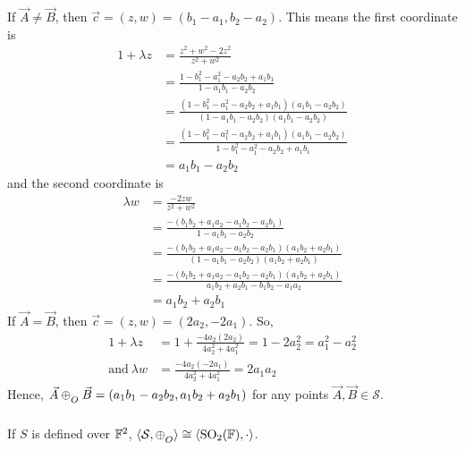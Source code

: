 \noindent
If $\vec{A}\neq\vec{B}$, then $\vec{c}=(z,w)=(b_1-a_1,b_2-a_2)$. This means the
first coordinate is
\begin{align*}
    1 + \lambda z &= \frac{z^2 + w^2 - 2z^2}{z^2 + w^2} \\
                  &= \frac{1 - b_1^2 - a_1^2 - a_2 b_2 + a_1 b_1}{1 - a_1 b_1 - a_2 b_2} \\
                  &= \frac{(1 - b_1^2 - a_1^2 - a_2 b_2 + a_1 b_1)(a_1 b_1 - a_2 b_2)}{(1 - a_1 b_1 - a_2 b_2)(a_1 b_1 - a_2 b_2)} \\
                  &= \frac{(1 - b_1^2 - a_1^2 - a_2 b_2 + a_1 b_1)(a_1 b_1 - a_2 b_2)}{1 - b_1^2 - a_1^2 - a_2 b_2 + a_1 b_1} \\
                  &= a_1 b_1 - a_2 b_2
\end{align*}
and the second coordinate is
\begin{align*}
    \lambda w     &= \frac{-2zw}{z^2 + w^2} \\
                  &= \frac{-(b_1 b_2 + a_1 a_2 - a_1 b_2 - a_2 b_1)}{1 - a_1 b_1 - a_2 b_2} \\
                  &= \frac{-(b_1 b_2 + a_1 a_2 - a_1 b_2 - a_2 b_1)(a_1 b_2 + a_2 b_1)}{(1 - a_1 b_1 - a_2 b_2)(a_1 b_2 + a_2 b_1)} \\
                  &= \frac{-(b_1 b_2 + a_1 a_2 - a_1 b_2 - a_2 b_1)(a_1 b_2 + a_2 b_1)}{a_1 b_2 + a_2 b_1 - b_1 b_2 - a_1 a_2} \\
                  &= a_1 b_2 + a_2 b_1
\end{align*}
If $\vec{A}=\vec{B}$, then $\vec{c}=(z,w)=(2a_2, -2a_1)$. So,
\begin{align*}
    1 + \lambda z &= 1 + \frac{-4a_2 (2 a_2)}{4a_2^2 + 4 a_1^2} = 1 - 2 a_2^2 = a_1^2 - a_2^2 \\
    \mathrm{and}\ \lambda w
                  &= \frac{-4a_2 (-2 a_1)}{4a_2^2 + 4 a_1^2} = 2 a_1 a_2
\end{align*}
Hence, $\vec{A}\conop\vec{B}=(a_1 b_1 - a_2 b_2,a_1 b_2 + a_2 b_1)$ for any points
$\vec{A},\vec{B}\in\mathcal{S}$.

\begin{theorem}
    If $S$ is defined over $\mathbb{F}^2$,
    $\langle\mathcal{S},\conop\rangle \cong \langle\SO{2}{F},\cdot\rangle$.
\end{theorem}

